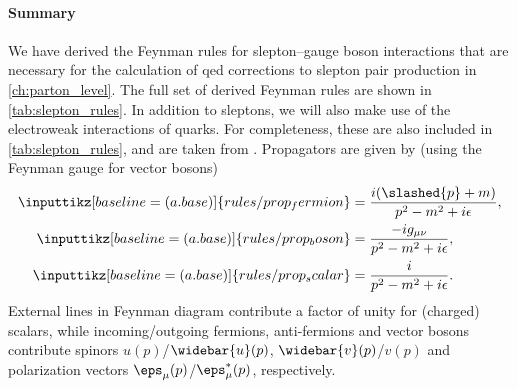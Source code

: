 \paragraph{Summary}
We have derived the Feynman rules for slepton--gauge boson interactions that are necessary for the calculation of \gls{qed} corrections to slepton pair production in \cref{ch:parton_level}. The full set of derived Feynman rules are shown in \cref{tab:slepton_rules}.
In addition to sleptons, we will also make use of the electroweak interactions of quarks.
For completeness, these are also included in \cref{tab:slepton_rules}, and are taken from \cite{Richardson:2000nt}.
Propagators are given by (using the Feynman gauge for vector bosons)~\cite{Peskin:1995ev}
\begin{equation}\label{eq:propagators_and_externals}
\begin{split}
    \inputtikz[baseline=(a.base)]{rules/prop_fermion} &= \frac{i(\slashed{p}+m)}{p^2-m^2+i\epsilon},
    \\
    \inputtikz[baseline=(a.base)]{rules/prop_boson} &= \frac{-ig_{\mu\nu}}{p^2-m^2+i\epsilon},
    \\
    \inputtikz[baseline=(a.base)]{rules/prop_scalar} &= \frac{i}{p^2-m^2+i\epsilon}.
\end{split}
\end{equation}
External lines in Feynman diagram contribute a factor of unity for (charged) scalars, while incoming/outgoing fermions, anti-fermions and vector bosons contribute spinors $u(p)$/$\widebar{u}(p)$, $\widebar{v}(p)$/$v(p)$ and polarization vectors $\eps_\mu(p)$/$\eps_\mu^*(p)$, respectively.


